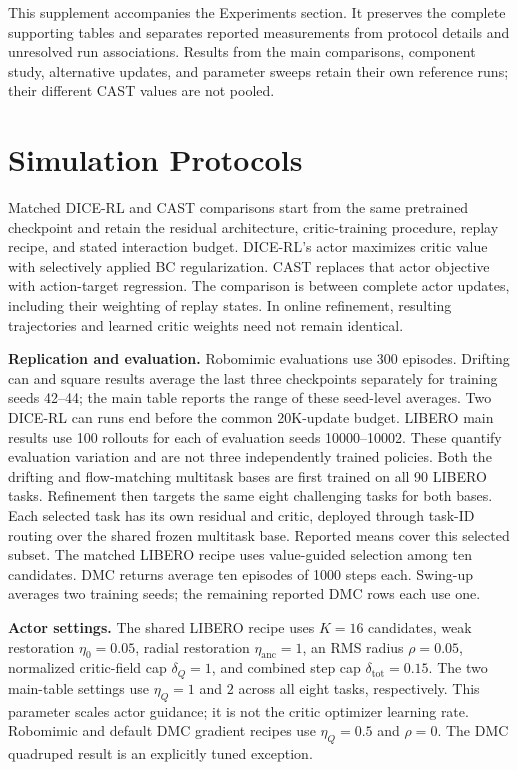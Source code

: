 This supplement accompanies the Experiments section. It preserves the
complete supporting tables and separates reported measurements from
protocol details and unresolved run associations. Results from the main
comparisons, component study, alternative updates, and parameter sweeps
retain their own reference runs; their different CAST values are not
pooled.

\section{Simulation Protocols}
\label{supp:protocols}
Matched DICE-RL and CAST comparisons start from the same pretrained
checkpoint and retain the residual architecture, critic-training procedure,
replay recipe, and stated interaction budget. DICE-RL's actor maximizes
critic value with selectively applied BC regularization. CAST replaces
that actor objective with action-target regression. The comparison is
between complete actor updates, including their weighting of replay
states. In online refinement, resulting trajectories and learned critic
weights need not remain identical.

\textbf{Replication and evaluation.}
Robomimic evaluations use 300 episodes. Drifting can and square results
average the last three checkpoints separately for training seeds 42--44;
the main table reports the range of these seed-level averages. Two
DICE-RL can runs end before the common 20K-update budget. LIBERO main
results use 100 rollouts for each of evaluation seeds 10000--10002.
These quantify evaluation variation and are not three independently
trained policies. Both the drifting and flow-matching multitask bases
are first trained on all 90 LIBERO tasks. Refinement then targets the same
eight challenging tasks for both bases. Each selected task has its own
residual and critic, deployed through task-ID routing over the shared
frozen multitask base. Reported means cover this selected subset.
The matched LIBERO recipe uses value-guided selection among ten candidates.
DMC returns average ten episodes of 1000 steps each. Swing-up averages
two training seeds; the remaining reported DMC rows each use one.

\textbf{Actor settings.}
The shared LIBERO recipe uses $K=16$ candidates, weak restoration
$\eta_0=0.05$, radial restoration $\eta_{\mathrm{anc}}=1$, an RMS radius
$\rho=0.05$, normalized critic-field cap $\delta_Q=1$, and combined
step cap $\delta_{\mathrm{tot}}=0.15$. The two main-table settings use
$\eta_Q=1$ and $2$ across all eight tasks, respectively. This parameter
scales actor guidance; it is not the critic optimizer learning rate.
Robomimic and default DMC gradient recipes use $\eta_Q=0.5$ and
$\rho=0$. The DMC quadruped result is an explicitly tuned exception.

